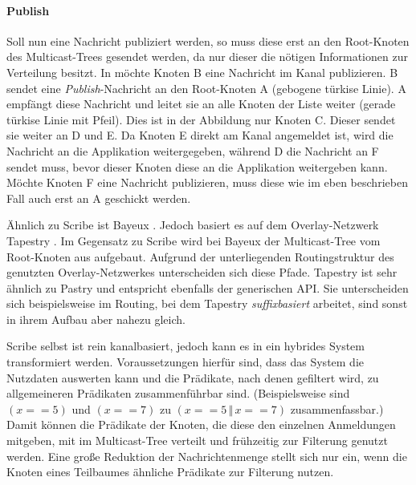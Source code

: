 \paragraph{Publish}
Soll nun eine Nachricht publiziert werden, so muss diese erst an den Root-Knoten des Multicast-Trees gesendet werden, da nur dieser die nötigen Informationen zur Verteilung besitzt. In  möchte Knoten B eine Nachricht im Kanal publizieren. B sendet eine \emph{Publish}-Nachricht an den Root-Knoten A (gebogene türkise Linie). A empfängt diese Nachricht und leitet sie an alle Knoten der Liste weiter (gerade türkise Linie mit Pfeil). Dies ist in der Abbildung nur Knoten C. Dieser sendet sie weiter an D und E. Da Knoten E direkt am Kanal angemeldet ist, wird die Nachricht an die Applikation weitergegeben, während D die Nachricht an F sendet muss, bevor dieser Knoten diese an die Applikation weitergeben kann. Möchte Knoten F eine Nachricht publizieren, muss diese wie im eben beschrieben Fall auch erst an A geschickt werden.

Ähnlich zu Scribe ist Bayeux \cite{Zhuang2001}. Jedoch basiert es auf dem Overlay-Netzwerk Tapestry \cite{Zhao2004Tapestry}. Im Gegensatz zu Scribe wird bei Bayeux der Multicast-Tree vom Root-Knoten aus aufgebaut. Aufgrund der unterliegenden Routingstruktur des genutzten Overlay-Netzwerkes unterscheiden sich diese Pfade. Tapestry ist sehr ähnlich zu Pastry und entspricht ebenfalls der generischen API. Sie unterscheiden sich beispielsweise im Routing, bei dem Tapestry \emph{suffixbasiert} arbeitet, sind sonst in ihrem Aufbau aber nahezu gleich.

Scribe selbst ist rein kanalbasiert, jedoch kann es in ein hybrides System transformiert werden. Voraussetzungen hierfür sind, dass das System die Nutzdaten auswerten kann und die Prädikate, nach denen gefiltert wird, zu allgemeineren Prädikaten zusammenführbar sind. (Beispielsweise sind $(x == 5)$ und $(x == 7)$ zu $(x == 5\,\Vert\,x == 7)$ zusammenfassbar.) Damit können die Prädikate der Knoten, die diese den einzelnen Anmeldungen mitgeben, mit im Multicast-Tree verteilt und frühzeitig zur Filterung genutzt werden. Eine große Reduktion der Nachrichtenmenge stellt sich nur ein, wenn die Knoten eines Teilbaumes ähnliche Prädikate zur Filterung nutzen.
